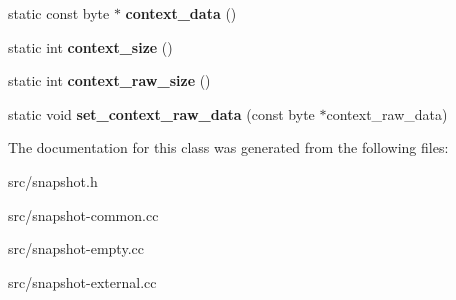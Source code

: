 \begin{DoxyCompactItemize}
\item 
\hypertarget{classv8_1_1internal_1_1_snapshot_a66eb30eb19b64f4d09e344a9a82b155f}{}static const byte $\ast$ {\bfseries context\+\_\+data} ()\label{classv8_1_1internal_1_1_snapshot_a66eb30eb19b64f4d09e344a9a82b155f}

\item 
\hypertarget{classv8_1_1internal_1_1_snapshot_ae3d6f6ed1291eccba092f783e7b8c64f}{}static int {\bfseries context\+\_\+size} ()\label{classv8_1_1internal_1_1_snapshot_ae3d6f6ed1291eccba092f783e7b8c64f}

\item 
\hypertarget{classv8_1_1internal_1_1_snapshot_af1825271d1c53a8d4390975dee066501}{}static int {\bfseries context\+\_\+raw\+\_\+size} ()\label{classv8_1_1internal_1_1_snapshot_af1825271d1c53a8d4390975dee066501}

\item 
\hypertarget{classv8_1_1internal_1_1_snapshot_a810f9a0191ea4fc7559599174073a7cb}{}static void {\bfseries set\+\_\+context\+\_\+raw\+\_\+data} (const byte $\ast$context\+\_\+raw\+\_\+data)\label{classv8_1_1internal_1_1_snapshot_a810f9a0191ea4fc7559599174073a7cb}

\end{DoxyCompactItemize}


The documentation for this class was generated from the following files\+:\begin{DoxyCompactItemize}
\item 
src/snapshot.\+h\item 
src/snapshot-\/common.\+cc\item 
src/snapshot-\/empty.\+cc\item 
src/snapshot-\/external.\+cc\end{DoxyCompactItemize}
